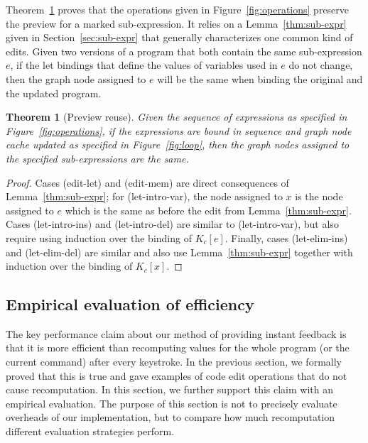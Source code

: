 \documentclass[english,submission]{programming}
\newcounter{thc}
\theoremstyle{plain}
\newtheorem{theorem}[thc]{Theorem}
\theoremstyle{definition}
\newcommand{\rname}[1]{{\sffamily(#1)}}
\begin{document}
Theorem~\ref{thm:preview-reuse} proves that the operations given in Figure~\ref{fig:operations}
preserve the preview for a marked sub-expression. It relies on a Lemma~\ref{thm:sub-expr} given in
Section~\ref{sec:sub-expr} that generally characterizes one common kind of edits. Given two versions
of a program that both contain the same sub-expression $e$, if the let bindings that define the values of
variables used in $e$ do not change, then the graph node assigned to $e$ will be the same
when binding the original and the updated program.



\begin{theorem}[Preview reuse]
\label{thm:preview-reuse}
Given the sequence of expressions as specified in Figure~\ref{fig:operations}, if the expressions
are bound in sequence and graph node cache updated as specified in Figure~\ref{fig:loop}, then
the graph nodes assigned to the specified sub-expressions are the same.
\end{theorem}
\begin{proof}
Cases \rname{edit-let} and \rname{edit-mem} are direct consequences of Lemma~\ref{thm:sub-expr};
for \rname{let-intro-var}, the node assigned to $x$ is the node assigned to $e$ which is the
same as before the edit from Lemma~\ref{thm:sub-expr}.
Cases \rname{let-intro-ins} and \rname{let-intro-del} are similar to \rname{let-intro-var}, but
also require using induction over the binding of $K_c[e]$. Finally, cases \rname{let-elim-ins}
and \rname{let-elim-del} are similar and also use Lemma~\ref{thm:sub-expr}
together with induction over the binding of $K_c[x]$.
\end{proof}


\subsection{Empirical evaluation of efficiency}
\label{sec:evaluation-empirical}

The key performance claim about our method of providing instant feedback is that it is more
efficient than recomputing values for the whole program (or the current command) after every
keystroke. In the previous section, we formally proved that this is true and gave examples of
code edit operations that do not cause recomputation. In this section, we further support this
claim with an empirical evaluation. The purpose of this section is not to precisely evaluate
overheads of our implementation, but to compare how much recomputation different evaluation
strategies perform.
\end{document}
